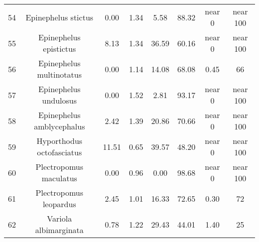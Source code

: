 \documentclass{report}\usepackage[]{graphicx}\usepackage[]{color}
\begin{document}
\begin{table}[ht]
{\begin{tabular}{cccccccc}
   54 & Epinephelus stictus & 0.00 & 1.34 & 5.58 & 88.32 & near 0 & near 100 \\ 
   55 & Epinephelus epistictus & 8.13 & 1.34 & 36.59 & 60.16 & near 0 & near 100 \\ 
   56 & Epinephelus multinotatus & 0.00 & 1.14 & 14.08 & 68.08 & 0.45 & 66 \\ 
   57 & Epinephelus undulosus & 0.00 & 1.52 & 2.81 & 93.17 & near 0 & near 100 \\ 
   58 & Epinephelus amblycephalus & 2.42 & 1.39 & 20.86 & 70.66 & near 0 & near 100 \\ 
   59 & Hyporthodus octofasciatus & 11.51 & 0.65 & 39.57 & 48.20 & near 0 & near 100 \\ 
   60 & Plectropomus maculatus & 0.00 & 0.96 & 0.00 & 98.68 & near 0 & near 100 \\ 
   61 & Plectropomus leopardus & 2.45 & 1.01 & 16.33 & 72.65 & 0.30 & 72 \\ 
   62 & Variola albimarginata & 0.78 & 1.22 & 29.43 & 44.01 & 1.40 & 25 \\ 
   \hline
\end{tabular}
}
\end{table}

\clearpage
\newpage
\end{document}
